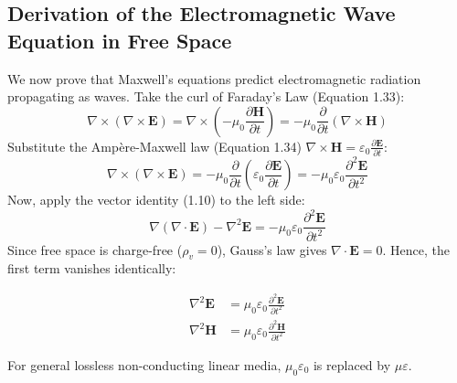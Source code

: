 \subsection{Derivation of the Electromagnetic Wave Equation in Free Space}
We now prove that Maxwell's equations predict electromagnetic radiation propagating as waves. Take the curl of Faraday's Law (Equation 1.33):
\begin{equation}
    \nabla \times (\nabla \times \mathbf{E}) = \nabla \times \left( -\mu_0 \frac{\partial \mathbf{H}}{\partial t} \right) = -\mu_0 \frac{\partial}{\partial t}(\nabla \times \mathbf{H})
\end{equation}
Substitute the Ampère-Maxwell law (Equation 1.34) $\nabla \times \mathbf{H} = \varepsilon_0 \frac{\partial \mathbf{E}}{\partial t}$:
\begin{equation}
    \nabla \times (\nabla \times \mathbf{E}) = -\mu_0 \frac{\partial}{\partial t}\left( \varepsilon_0 \frac{\partial \mathbf{E}}{\partial t} \right) = -\mu_0 \varepsilon_0 \frac{\partial^2 \mathbf{E}}{\partial t^2}
\end{equation}
Now, apply the vector identity (1.10) to the left side:
\begin{equation}
    \nabla(\nabla \cdot \mathbf{E}) - \nabla^2 \mathbf{E} = -\mu_0 \varepsilon_0 \frac{\partial^2 \mathbf{E}}{\partial t^2}
\end{equation}
Since free space is charge-free ($\rho_v = 0$), Gauss's law gives $\nabla \cdot \mathbf{E} = 0$. Hence, the first term vanishes identically:

\begin{keyequation}
\begin{align}
    \nabla^2 \mathbf{E} &= \mu_0 \varepsilon_0 \frac{\partial^2 \mathbf{E}}{\partial t^2} \\
    \nabla^2 \mathbf{H} &= \mu_0 \varepsilon_0 \frac{\partial^2 \mathbf{H}}{\partial t^2}
\end{align}
\end{keyequation}
For general lossless non-conducting linear media, $\mu_0 \varepsilon_0$ is replaced by $\mu \varepsilon$.

